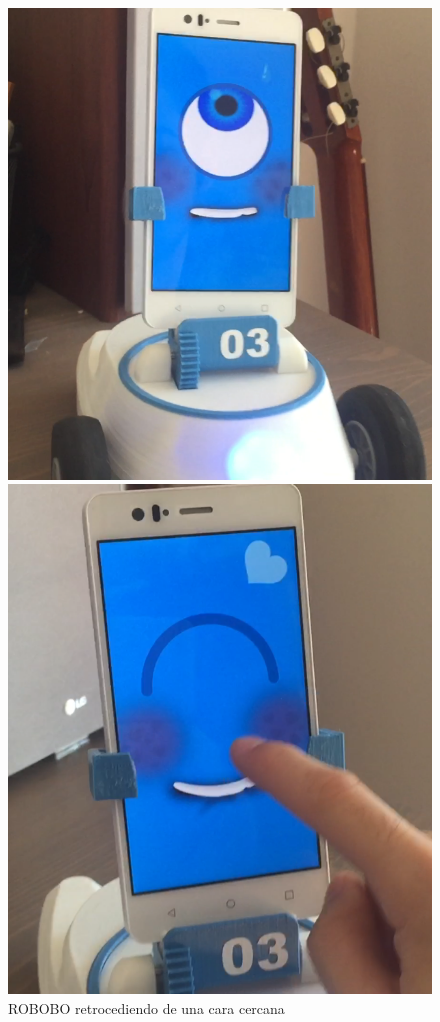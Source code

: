 \begin{figure}
\centering
\begin{minipage}{0.45\textwidth}
\centering
\includegraphics[width=1\linewidth]{imagenes/pet_close.png}
\caption{ROBOBO retrocediendo de una cara cercana}
\label{fig:pet_close}

\end{minipage}\hfill
\begin{minipage}{0.45\textwidth}
\centering
\includegraphics[width=1\linewidth]{imagenes/pet_pet.png}


\end{minipage}
\end{figure}
